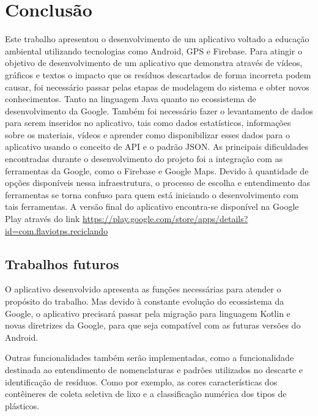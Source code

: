 \documentclass[
	12pt,				%
	openany,			%
	twoside,			%
	a4paper,			%
	english,			%
	french,				%
	spanish,			%
	brazil				%
	]{abntex2}
\begin{document}
\chapter{Conclusão}
Este trabalho apresentou o desenvolvimento de um aplicativo voltado a educação ambiental utilizando tecnologias como Android, GPS e Firebase. Para atingir o objetivo de desenvolvimento de um aplicativo que demonstra através de vídeos, gráficos e textos o impacto que os resíduos descartados de forma incorreta podem causar, foi necessário passar pelas etapas de modelagem do sistema e obter novos conhecimentos. Tanto na linguagem Java quanto no ecossistema de desenvolvimento da Google. Também foi necessário fazer o levantamento de dados para serem inseridos no aplicativo, tais como dados estatísticos, informações sobre os materiais, vídeos e aprender como disponibilizar esses dados para o aplicativo usando o conceito de API e o padrão JSON.
As principais dificuldades encontradas durante o desenvolvimento do projeto foi a integração com as ferramentas da Google, como o Firebase e Google Maps. Devido à quantidade de opções disponíveis nessa infraestrutura, o processo de escolha e entendimento das ferramentas se torna confuso para quem está iniciando o desenvolvimento com tais ferramentas.
A versão final do aplicativo encontra-se disponível na Google Play através do link \href{https://play.google.com/store/apps/details?id=com.flaviotps.reciclando}{https://play.google.com/store/apps/details?id=com.flaviotps.reciclando}

\section{Trabalhos futuros}
O aplicativo desenvolvido apresenta as funções necessárias para atender o propósito do trabalho. Mas devido à constante evolução do ecossistema da Google, o aplicativo precisará passar pela migração para linguagem Kotlin e novas diretrizes da Google, para que seja compatível com as futuras versões do Android.

Outras funcionalidades também serão implementadas, como a funcionalidade destinada ao entendimento de nomenclaturas e padrões utilizados no descarte e identificação de resíduos. Como por exemplo, as cores características dos contêineres de coleta seletiva de lixo e a classificação numérica dos tipos de plásticos. 


\postextual
\end{document}
